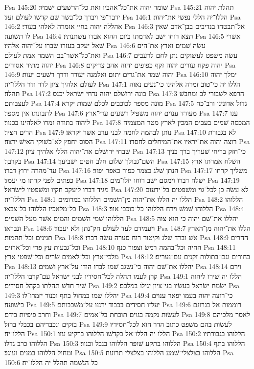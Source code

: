 Psa 145:20  שׁומר יהוה את־כל־אהביו ואת כל־הרשׁעים ישׁמיד׃
Psa 145:21  תהלת יהוה ידבר־פי ויברך כל־בשׂר שׁם קדשׁו לעולם ועד׃
Psa 146:1  הללו־יה הללי נפשׁי את־יהוה׃
Psa 146:2  אהללה יהוה בחיי אזמרה לאלהי בעודי׃
Psa 146:3  אל־תבטחו בנדיבים בבן־אדם שׁאין לו תשׁועה׃
Psa 146:4  תצא רוחו ישׁב לאדמתו ביום ההוא אבדו עשׁתנתיו׃
Psa 146:5  אשׁרי שׁאל יעקב בעזרו שׂברו על־יהוה אלהיו׃
Psa 146:6  עשׂה שׁמים וארץ את־הים ואת־כל־אשׁר־בם השׁמר אמת לעולם׃
Psa 146:7  עשׂה משׁפט לעשׁוקים נתן לחם לרעבים יהוה מתיר אסורים׃
Psa 146:8  יהוה פקח עורים יהוה זקף כפופים יהוה אהב צדיקים׃
Psa 146:9  יהוה שׁמר את־גרים יתום ואלמנה יעודד ודרך רשׁעים יעות׃
Psa 146:10  ימלך יהוה לעולם אלהיך ציון לדר ודר הללו־יה׃
Psa 147:1  הללו יה כי־טוב זמרה אלהינו כי־נעים נאוה תהלה׃
Psa 147:2  בונה ירושׁלם יהוה נדחי ישׂראל יכנס׃
Psa 147:3  הרפא לשׁבורי לב ומחבשׁ לעצבותם׃
Psa 147:4  מונה מספר לכוכבים לכלם שׁמות יקרא׃
Psa 147:5  גדול אדונינו ורב־כח לתבונתו אין מספר׃
Psa 147:6  מעודד ענוים יהוה משׁפיל רשׁעים עדי־ארץ׃
Psa 147:7  ענו ליהוה בתודה זמרו לאלהינו בכנור׃
Psa 147:8  המכסה שׁמים בעבים המכין לארץ מטר המצמיח הרים חציר׃
Psa 147:9  נותן לבהמה לחמה לבני ערב אשׁר יקראו׃
Psa 147:10  לא בגבורת הסוס יחפץ לא־בשׁוקי האישׁ ירצה׃
Psa 147:11  רוצה יהוה את־יראיו את־המיחלים לחסדו׃
Psa 147:12  שׁבחי ירושׁלם את־יהוה הללי אלהיך ציון׃
Psa 147:13  כי־חזק בריחי שׁעריך ברך בניך בקרבך׃
Psa 147:14  השׂם־גבולך שׁלום חלב חטים ישׂביעך׃
Psa 147:15  השׁלח אמרתו ארץ עד־מהרה ירוץ דברו׃
Psa 147:16  הנתן שׁלג כצמר כפור כאפר יפזר׃
Psa 147:17  משׁליך קרחו כפתים לפני קרתו מי יעמד׃
Psa 147:18  ישׁלח דברו וימסם ישׁב רוחו יזלו־מים׃
Psa 147:19  מגיד דברו ליעקב חקיו ומשׁפטיו לישׂראל׃
Psa 147:20  לא עשׂה כן לכל־גוי ומשׁפטים בל־ידעום הללו־יה׃
Psa 148:1  הללו יה הללו את־יהוה מן־השׁמים הללוהו במרומים׃
Psa 148:2  הללוהו כל־מלאכיו הללוהו כל־צבאו׃
Psa 148:3  הללוהו שׁמשׁ וירח הללוהו כל־כוכבי אור׃
Psa 148:4  הללוהו שׁמי השׁמים והמים אשׁר מעל השׁמים׃
Psa 148:5  יהללו את־שׁם יהוה כי הוא צוה ונבראו׃
Psa 148:6  ויעמידם לעד לעולם חק־נתן ולא יעבור׃
Psa 148:7  הללו את־יהוה מן־הארץ תנינים וכל־תהמות׃
Psa 148:8  אשׁ וברד שׁלג וקיטור רוח סערה עשׂה דברו׃
Psa 148:9  ההרים וכל־גבעות עץ פרי וכל־ארזים׃
Psa 148:10  החיה וכל־בהמה רמשׂ וצפור כנף׃
Psa 148:11  מלכי־ארץ וכל־לאמים שׂרים וכל־שׁפטי ארץ׃
Psa 148:12  בחורים וגם־בתולות זקנים עם־נערים׃
Psa 148:13  יהללו את־שׁם יהוה כי־נשׂגב שׁמו לבדו הודו על־ארץ ושׁמים׃
Psa 148:14  וירם קרן לעמו תהלה לכל־חסידיו לבני ישׂראל עם־קרבו הללו־יה׃
Psa 149:1  הללו יה שׁירו ליהוה שׁיר חדשׁ תהלתו בקהל חסידים׃
Psa 149:2  ישׂמח ישׂראל בעשׂיו בני־ציון יגילו במלכם׃
Psa 149:3  יהללו שׁמו במחול בתף וכנור יזמרו־לו׃
Psa 149:4  כי־רוצה יהוה בעמו יפאר ענוים בישׁועה׃
Psa 149:5  יעלזו חסידים בכבוד ירננו על־משׁכבותם׃
Psa 149:6  רוממות אל בגרונם וחרב פיפיות בידם׃
Psa 149:7  לעשׂות נקמה בגוים תוכחת בל־אמים׃
Psa 149:8  לאסר מלכיהם בזקים ונכבדיהם בכבלי ברזל׃
Psa 149:9  לעשׂות בהם משׁפט כתוב הדר הוא לכל־חסידיו הללו־יה׃
Psa 150:1  הללו יה הללו־אל בקדשׁו הללוהו ברקיע עזו׃
Psa 150:2  הללוהו בגבורתיו הללוהו כרב גדלו׃
Psa 150:3  הללוהו בתקע שׁופר הללוהו בנבל וכנור׃
Psa 150:4  הללוהו בתף ומחול הללוהו במנים ועוגב׃
Psa 150:5  הללוהו בצלצלי־שׁמע הללוהו בצלצלי תרועה׃
Psa 150:6  כל הנשׁמה תהלל יה הללו־יה׃


